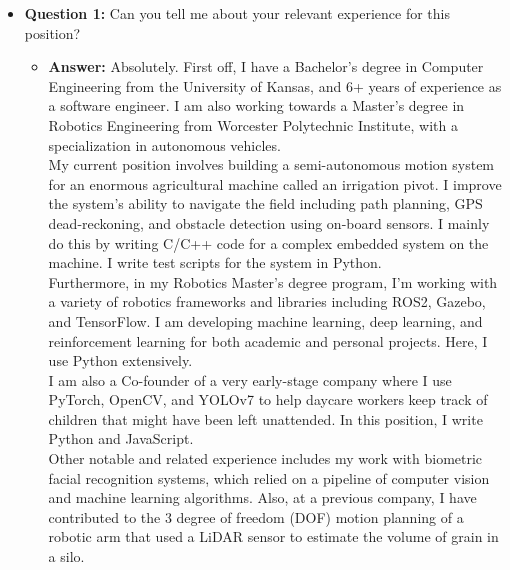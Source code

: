 \documentclass{article}
\begin{document}
\begin{itemize}
    \item \textbf{Question 1:} Can you tell me about your relevant experience for this position?
    \begin{itemize}
        \item \textbf{Answer:} Absolutely. First off, I have a Bachelor's degree in 
        Computer Engineering from the University of Kansas, and 
        6+ years of experience as a software engineer. I am also
        working towards a Master's degree in Robotics Engineering
        from Worcester Polytechnic Institute, with a specialization
        in autonomous vehicles.\\

        My current position involves building a semi-autonomous motion system
        for an enormous agricultural machine called an irrigation pivot.
        I improve the system's ability to navigate the field including
        path planning, GPS dead-reckoning, and obstacle detection using
        on-board sensors. I mainly
        do this by writing C/C++ code for a complex embedded system on the machine.
        I write test scripts for the system in Python.\\

        Furthermore, in my Robotics Master's degree program, I'm working with
        a variety of robotics frameworks
        and libraries including ROS2, Gazebo, and TensorFlow. I am developing
        machine learning, deep learning, and reinforcement learning
        for both academic and personal projects. Here, I use Python extensively.\\

        I am also a Co-founder of a very early-stage company where I use
        PyTorch, OpenCV, and YOLOv7 to help daycare workers keep track of
        children that might have been left unattended. In this position,
        I write Python and JavaScript.\\

        Other notable and related experience includes my work with biometric
        facial recognition systems, which relied on a pipeline of computer
        vision and machine learning algorithms. Also, at a previous company,
        I have contributed to the 3 degree of freedom (DOF) motion planning
        of a robotic arm that used a LiDAR sensor to estimate the volume
        of grain in a silo.\\
    \end{itemize}
    

\end{itemize}
\end{document}
